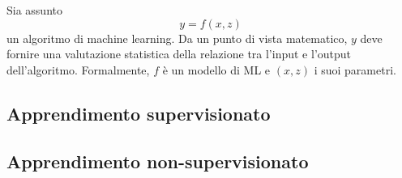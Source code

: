 \documentclass{subfiles}
\begin{document}
\label{sec:3}
Sia assunto
\[
    y = f(x, z)
\]
un algoritmo di machine learning.
Da un punto di vista matematico, \(y\) deve fornire una valutazione statistica della relazione tra l'input e l'output dell'algoritmo.
Formalmente, \(f\) è un modello di ML e \((x, z)\) i suoi parametri.

\subsection{Apprendimento supervisionato}


\subsection{Apprendimento non-supervisionato}

\clearpage
\end{document}
